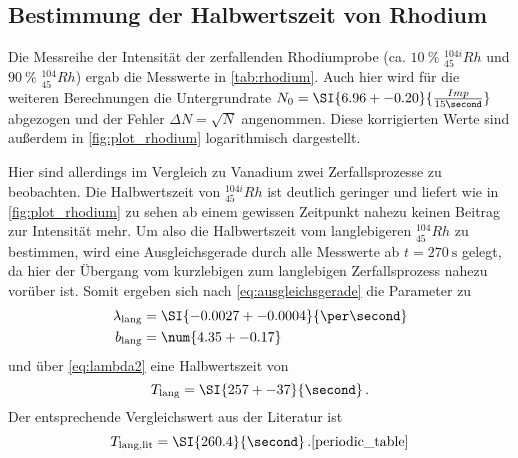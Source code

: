 \subsection{Bestimmung der Halbwertszeit von Rhodium}
\label{ssec:auswertung_rhodium}

Die Messreihe der Intensität der zerfallenden Rhodiumprobe (ca. $\SI{10}{\percent}$ $ ^{104i}_{45}Rh$ und $\SI{90}{\percent}$ $ ^{104}_{45}Rh$) ergab die Messwerte in \autoref{tab:rhodium}.
Auch hier wird für die weiteren Berechnungen die Untergrundrate $N_0=\SI{6.96+-0.20}{\frac{Imp}{15\second}}$ abgezogen und der Fehler $\Delta N = \sqrt{N}$ angenommen.
Diese korrigierten Werte sind außerdem in \autoref{fig:plot_rhodium} logarithmisch dargestellt.

Hier sind allerdings im Vergleich zu Vanadium zwei Zerfallsprozesse zu beobachten. 
Die Halbwertszeit von $ ^{104i}_{45}Rh$ ist deutlich geringer und liefert wie in \autoref{fig:plot_rhodium} zu sehen ab einem gewissen Zeitpunkt nahezu keinen Beitrag zur Intensität mehr.
Um also die Halbwertszeit vom langlebigeren $ ^{104}_{45}Rh$ zu bestimmen, wird eine Ausgleichsgerade durch alle Messwerte ab $t=\SI{270}{\second}$ gelegt, da hier der Übergang vom kurzlebigen zum langlebigen Zerfallsprozess nahezu vorüber ist.
Somit ergeben sich nach \autoref{eq:ausgleichsgerade} die Parameter zu 
\begin{align*}
    \lambda_\text{lang} &= \SI{-0.0027+-0.0004}{\per\second} \\
    b_\text{lang} &= \num{4.35+-0.17}
\end{align*}
und über \autoref{eq:lambda2} eine Halbwertszeit von 
\begin{equation*}
    T_\text{lang} = \SI{257+-37}{\second} \, .
\end{equation*}
Der entsprechende Vergleichswert aus der Literatur ist 
\begin{equation*}
    T_\text{lang,lit} = \SI{260.4}{\second} \, .\text{\cite{periodic_table}}
\end{equation*}

